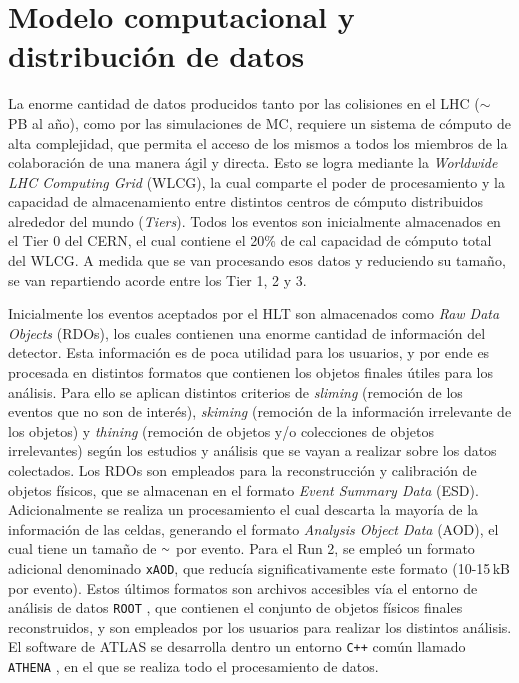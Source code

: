 
\section{Modelo computacional y distribución de datos}\label{sec:lhc_samples}


La enorme cantidad de datos producidos tanto por las colisiones en el LHC ($\sim$\,PB al año), como por las simulaciones de MC, requiere un sistema de cómputo de alta complejidad, que permita el acceso de los mismos a todos los miembros de la colaboración de una manera ágil y directa. Esto se logra mediante la \textit{Worldwide LHC Computing Grid} (WLCG), la cual comparte el poder de procesamiento y la capacidad de almacenamiento entre distintos centros de cómputo distribuidos alrededor del mundo (\textit{Tiers}). Todos los eventos son inicialmente almacenados en el Tier 0 del CERN, el cual contiene el 20\% de cal capacidad de cómputo total del WLCG. A medida que se van procesando esos datos y reduciendo su tamaño, se van repartiendo acorde entre los Tier 1, 2 y 3.

Inicialmente los eventos aceptados por el HLT son almacenados como \textit{Raw Data Objects} (RDOs), los cuales contienen una enorme cantidad de información del detector. Esta información es de poca utilidad para los usuarios, y por ende es procesada en distintos formatos que contienen los objetos finales útiles para los análisis. Para ello se aplican distintos criterios de \textit{sliming} (remoción de los eventos que no son de interés), \textit{skiming} (remoción de la información irrelevante de los objetos) y \textit{thining} (remoción de objetos y/o colecciones de objetos irrelevantes) según los estudios y análisis que se vayan a realizar sobre los datos colectados. Los RDOs son empleados para la reconstrucción y calibración de objetos físicos, que se almacenan en el formato \textit{Event Summary Data} (ESD). Adicionalmente se realiza un procesamiento el cual descarta la mayoría de la información de las celdas, generando el formato \textit{Analysis Object Data} (AOD), el cual tiene un tamaño de {$\smallsim$} por evento. Para el Run 2, se empleó un formato adicional denominado \texttt{xAOD}, que reducía significativamente este formato (10-15\,kB por evento). Estos últimos formatos son archivos accesibles vía el entorno de análisis de datos \texttt{ROOT} \cite{root}, que contienen el conjunto de objetos físicos finales reconstruidos, y son empleados por los usuarios para realizar los distintos análisis.
El software de ATLAS se desarrolla dentro un entorno \texttt{C++} común llamado \texttt{ATHENA} \cite{ATLAS-TDR-17, analysistools, athena}, en el que se realiza todo el procesamiento de datos. 

